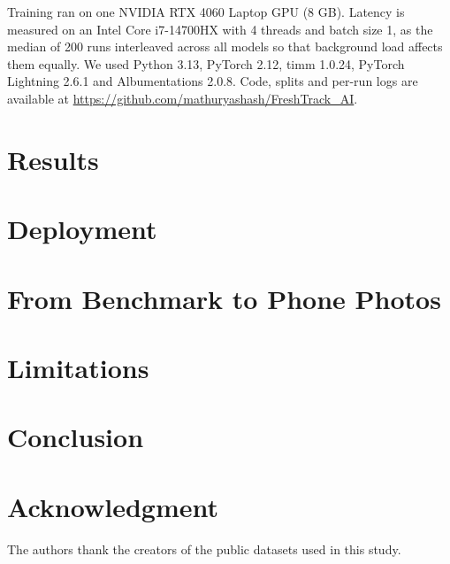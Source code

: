 \documentclass[conference]{IEEEtran}
\begin{document}
Training ran on one NVIDIA RTX 4060 Laptop GPU (8 GB). Latency is measured on
an Intel Core i7-14700HX with 4 threads and batch size 1, as the median of 200
runs interleaved across all models so that background load affects them
equally. We used Python 3.13, PyTorch 2.12, timm 1.0.24, PyTorch Lightning 2.6.1
and Albumentations 2.0.8. Code, splits and per-run logs are available at
\url{https://github.com/mathuryashash/FreshTrack_AI}.

\section{Results}


\section{Deployment}

\section{From Benchmark to Phone Photos}\label{sec:phone}


\section{Limitations}


\section{Conclusion}


\section*{Acknowledgment}
The authors thank the creators of the public datasets used in this study.



\end{document}
